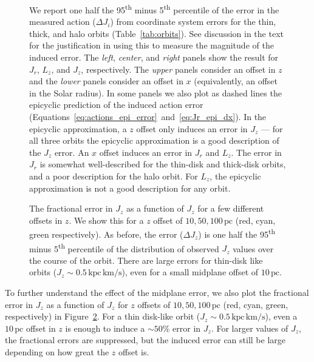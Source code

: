 \documentclass[twocolumn]{aastex62}
\newcommand{\pc}{\text{pc}}
\newcommand{\kms}{\text{km}/\text{s}}
\newcommand{\actunit}{\text{kpc}\,\kms}
\newcommand{\uth}{\textsuperscript{th}}
\begin{document}
\begin{figure}
\caption{We report one half the 95\uth{} minus 5\uth{} percentile of the error
in the measured action ($\Delta J_i$) from coordinate system errors for the
thin, thick, and halo orbits (Table~\ref{tab:orbits}). See discussion in the
text for the justification in using this to measure the magnitude of the
induced error. The {\em left}, {\em center}, and {\em right} panels show the
result for $J_r$, $L_z$, and $J_z$, respectively. The {\em upper} panels
consider an offset in $z$ and the {\em lower} panels consider an offset in $x$
(equivalently, an offset in the Solar radius). In some panels we also plot as
dashed lines the epicyclic prediction of the induced action error
(Equations~\ref{eq:actions_epi_error}~and~\ref{eq:Jr_epi_dx}). In the
epicyclic approximation, a $z$ offset only induces an error in $J_z$ --- for
all three orbits the epicyclic approximation is a good description of the
$J_z$ error. An $x$ offset induces an error in $J_r$ and $L_z$. The error in
$J_r$ is somewhat well-described for the thin-disk and thick-disk orbits, and
a poor description for the halo orbit. For $L_z$, the epicyclic approximation
is not a good description for any orbit.}
\label{fig:many_orbit_wrong_ref}
\end{figure}

\begin{figure}
\caption{The fractional error in $J_z$ as a function of $J_z$ for a few
different offsets in $z$. We show this for a $z$ offset of $10, 50, 100\,\pc$
(red, cyan, green respectively). As before, the error ($\Delta J_z$) is one
half the 95\uth{} minus 5\uth{} percentile of the distribution of observed
$J_z$ values over the course of the orbit. There are large errors for
thin-disk like orbits ($J_z \sim 0.5\,\actunit$), even for a small midplane
offset of $10\,\pc$. }
\label{fig:dJz_fun_Jz}
\end{figure}

To further understand the effect of the midplane error, we also plot the
fractional error in $J_z$ as a function of $J_z$ for $z$ offsets of $10, 50,
100\,\pc$ (red, cyan, green, respectively) in Figure~\ref{fig:dJz_fun_Jz}. For
a thin disk-like orbit ($J_z\sim0.5\,\actunit$), even a $10\,\pc$ offset in
$z$ is enough to induce a $\sim50\%$ error in $J_z$. For larger values of
$J_z$, the fractional errors are suppressed, but the induced error can still
be large depending on how great the $z$ offset is.
\end{document}
